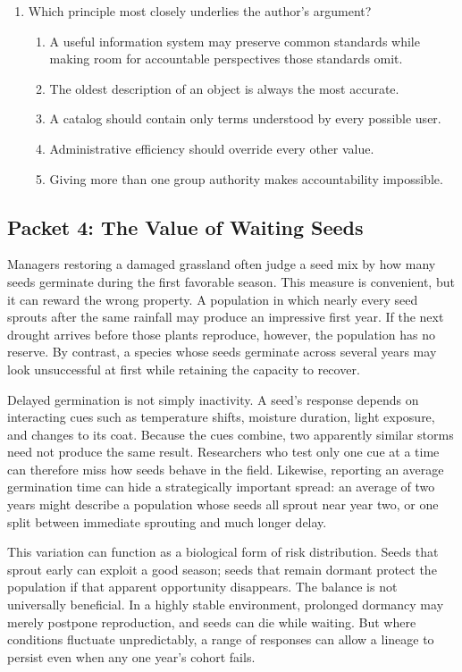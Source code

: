 \begin{enumerate}
\item Which principle most closely underlies the author's argument?
\begin{enumerate}
\item[(A)] A useful information system may preserve common standards while making room for accountable perspectives those standards omit.
\item[(B)] The oldest description of an object is always the most accurate.
\item[(C)] A catalog should contain only terms understood by every possible user.
\item[(D)] Administrative efficiency should override every other value.
\item[(E)] Giving more than one group authority makes accountability impossible.
\end{enumerate}

\end{enumerate}

\subsection*{Packet 4: The Value of Waiting Seeds}

Managers restoring a damaged grassland often judge a seed mix by how many seeds germinate during the first favorable season. This measure is convenient, but it can reward the wrong property. A population in which nearly every seed sprouts after the same rainfall may produce an impressive first year. If the next drought arrives before those plants reproduce, however, the population has no reserve. By contrast, a species whose seeds germinate across several years may look unsuccessful at first while retaining the capacity to recover.

Delayed germination is not simply inactivity. A seed's response depends on interacting cues such as temperature shifts, moisture duration, light exposure, and changes to its coat. Because the cues combine, two apparently similar storms need not produce the same result. Researchers who test only one cue at a time can therefore miss how seeds behave in the field. Likewise, reporting an average germination time can hide a strategically important spread: an average of two years might describe a population whose seeds all sprout near year two, or one split between immediate sprouting and much longer delay.

This variation can function as a biological form of risk distribution. Seeds that sprout early can exploit a good season; seeds that remain dormant protect the population if that apparent opportunity disappears. The balance is not universally beneficial. In a highly stable environment, prolonged dormancy may merely postpone reproduction, and seeds can die while waiting. But where conditions fluctuate unpredictably, a range of responses can allow a lineage to persist even when any one year's cohort fails.

